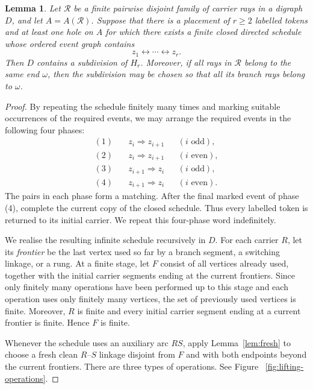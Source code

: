 \documentclass[11pt]{article}
\newtheorem{lemma}[theorem]{Lemma}
\theoremstyle{remark}
\newcommand{\cR}{\mathcal{R}}
\numberwithin{equation}{section}
\begin{document}
\begin{lemma}\label{lem:lifting}
Let $\cR$ be a finite pairwise disjoint family of carrier rays in a digraph $D$, and let $A=A(\cR)$. Suppose that there is a placement of $r\geq 2$ labelled tokens and at least one hole on $A$ for which there exists a finite closed directed schedule whose ordered event graph contains
\[
z_1\leftrightarrow\cdots\leftrightarrow z_r.
\]
Then $D$ contains a subdivision of $H_r$. Moreover, if all rays in $\mathcal R$ belong to the same end $\omega$, then the subdivision may be chosen so that all its branch rays belong to $\omega$.
\end{lemma}

\begin{proof}
By repeating the schedule finitely many times and marking suitable occurrences of the required events, we may arrange the required events in the following four phases:
\begin{equation}\label{eq:four-phases}
\begin{aligned}
(1)&\quad z_i\Rightarrow z_{i+1} &&(i\text{ odd}),\\
(2)&\quad z_i\Rightarrow z_{i+1} &&(i\text{ even}),\\
(3)&\quad z_{i+1}\Rightarrow z_i &&(i\text{ odd}),\\
(4)&\quad z_{i+1}\Rightarrow z_i &&(i\text{ even}).
\end{aligned}
\end{equation}
The pairs in each phase form a matching. After the final marked event of phase (4), complete the current copy of the closed schedule. Thus every labelled token is returned to its initial carrier. We repeat this four-phase word indefinitely.

We realise the resulting infinite schedule recursively in $D$. For each carrier $R$, let its \emph{frontier} be the last vertex used so far by a branch segment, a switching linkage, or a rung. At a finite stage, let $F$ consist of all vertices already used, together with the initial carrier segments ending at the current frontiers. Since only finitely many operations have been performed up to this stage and each operation uses only finitely many vertices, the set of previously used vertices is finite. Moreover, $R$ is finite and every initial carrier segment ending at a current frontier is finite. Hence $F$ is finite.

Whenever the schedule uses an auxiliary arc $RS$, apply Lemma~\ref{lem:fresh} to choose a fresh clean $R$--$S$ linkage disjoint from $F$ and with both endpoints beyond the current frontiers. There are three types of operations. See Figure ~\ref{fig:lifting-operations}.


\end{proof}
\end{document}
